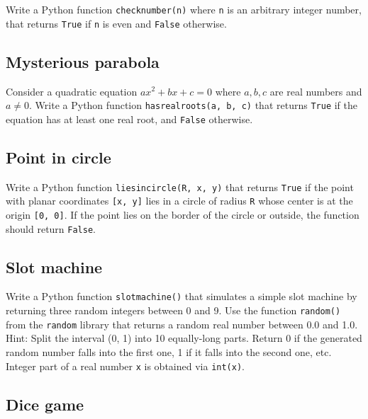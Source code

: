 Write a Python function {\tt checknumber(n)} where {\tt n} is an arbitrary 
integer number, that returns {\tt True} if {\tt n} is even and {\tt False}
otherwise.


\subsection{Mysterious parabola}

Consider a quadratic equation $ax^2 + bx + c = 0$ where $a, b, c$ are real numbers 
and $a \not = 0$. Write a Python function 
{\tt hasrealroots(a, b, c)} that returns {\tt True} if the equation has 
at least one real root, and {\tt False} otherwise.


\subsection{Point in circle}

Write a Python function {\tt liesincircle(R, x, y)} that returns {\tt True} if 
the point with planar coordinates {\tt [x, y]} lies in a circle of radius {\tt R}
whose center is at the origin {\tt [0, 0]}. If the point lies on the border of the 
circle or outside, the function should return {\tt False}.


\subsection{Slot machine}

Write a Python function {\tt slotmachine()} that simulates a simple slot machine
by returning three random integers between 0 and 9. Use the function 
{\tt random()} from the {\tt random} library that returns a random 
real number between 0.0 and 1.0. Hint: Split the interval (0, 1) into 10 
equally-long parts. Return 0 if the generated random number falls into the 
first one, 1 if it falls into the second one, etc. Integer part of a real number
{\tt x} is obtained via {\tt int(x)}.


\subsection{Dice game}

